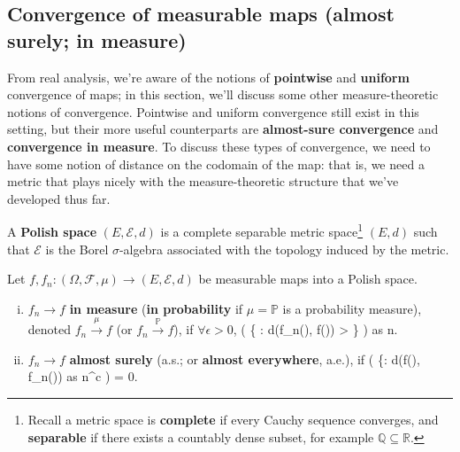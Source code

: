 \subsection{Convergence of measurable maps (almost surely; in measure)}

From real analysis, we're aware of the notions of \textbf{pointwise} and \textbf{uniform} convergence of maps; in this section, we'll discuss some other measure-theoretic notions of convergence. Pointwise and uniform convergence still exist in this setting, but their more useful counterparts are \textbf{almost-sure convergence} and \textbf{convergence in measure}. To discuss these types of convergence, we need to have some notion of distance on the codomain of the map: that is, we need a metric that plays nicely with the measure-theoretic structure that we've developed thus far. 

\begin{definition}
	A \textbf{Polish space} $(E, \mathcal E, d)$ is a complete separable metric space\footnote{Recall a metric space is \textbf{complete} if every Cauchy sequence converges, and \textbf{separable} if there exists a countably dense subset, for example $\mathbb Q\subseteq\mathbb R$.} $(E, d)$ such that $\mathcal E$ is the Borel $\sigma$-algebra associated with the topology induced by the metric. 
\end{definition}

\begin{definition}
	Let $f, f_n : (\Omega, \mathcal F, \mu)\rightarrow (E, \mathcal E, d)$ be measurable maps into a Polish space. 
	\begin{enumerate}[i)]
		\item $f_n\longrightarrow f$ \textbf{in measure} (\textbf{in probability} if $\mu = \mathbb P$ is a probability measure), denoted $f_n\overset{\mu}{\longrightarrow} f$ (or $f_n\overset{\mathbb P}{\longrightarrow} f$), if $\forall \epsilon > 0$, 
		\eq
			\mu\left( \left\{ \omega \in\Omega : d(f_n(\omega), f(\omega)) > \epsilon \right\} \right) \textnormal{ as } n\rightarrow\infty.
		\qe
		\item $f_n\longrightarrow f$ \textbf{almost surely} (a.s.; or \textbf{almost everywhere}, a.e.), if
		\eq
			\mu\left( \{\omega \in\Omega : d(f(\omega), f_n(\omega))\textnormal{ as } n\rightarrow\infty^c \right) = 0.
		\qe
	\end{enumerate}
\end{definition}

